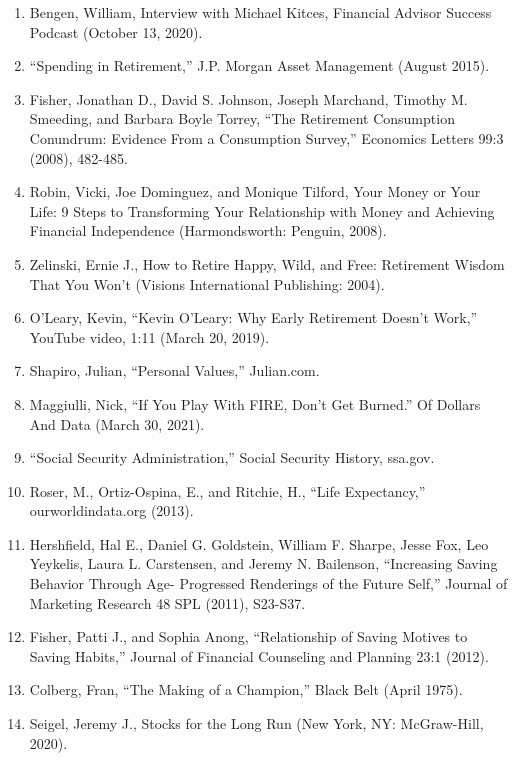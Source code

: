 \begin{enumerate}
\item\hypertarget{endnote:52}{} Bengen, William, Interview with Michael Kitces, Financial Advisor Success Podcast (October 13, 2020).
\item\hypertarget{endnote:53}{} “Spending in Retirement,” J.P. Morgan Asset Management (August 2015).
\item\hypertarget{endnote:54}{} Fisher, Jonathan D., David S. Johnson, Joseph Marchand, Timothy M. Smeeding, and Barbara Boyle Torrey, “The Retirement Consumption Conundrum: Evidence From a Consumption Survey,” Economics Letters 99:3 (2008), 482-485.
\item\hypertarget{endnote:55}{} Robin, Vicki, Joe Dominguez, and Monique Tilford, Your Money or Your Life: 9 Steps to Transforming Your Relationship with Money and Achieving Financial Independence (Harmondsworth: Penguin, 2008).
\item\hypertarget{endnote:56}{} Zelinski, Ernie J., How to Retire Happy, Wild, and Free: Retirement Wisdom That You Won't (Visions International Publishing: 2004).
\item\hypertarget{endnote:57}{} O'Leary, Kevin, “Kevin O'Leary: Why Early Retirement Doesn't Work,” YouTube video, 1:11 (March 20, 2019).
\item\hypertarget{endnote:58}{} Shapiro, Julian, “Personal Values,” Julian.com.
\item\hypertarget{endnote:59}{} Maggiulli, Nick, “If You Play With FIRE, Don't Get Burned.” Of Dollars And Data (March 30, 2021).
\item\hypertarget{endnote:60}{} “Social Security Administration,” Social Security History, ssa.gov.
\item\hypertarget{endnote:61}{} Roser, M., Ortiz-Ospina, E., and Ritchie, H., “Life Expectancy,” ourworldindata.org (2013).
\item\hypertarget{endnote:62}{} Hershfield, Hal E., Daniel G. Goldstein, William F. Sharpe, Jesse Fox, Leo Yeykelis, Laura L. Carstensen, and Jeremy N. Bailenson, “Increasing Saving Behavior Through Age- Progressed Renderings of the Future Self,” Journal of Marketing Research 48 SPL (2011), S23-S37.
\item\hypertarget{endnote:63}{} Fisher, Patti J., and Sophia Anong, “Relationship of Saving Motives to Saving Habits,” Journal of Financial Counseling and Planning 23:1 (2012).
\item\hypertarget{endnote:64}{} Colberg, Fran, “The Making of a Champion,” Black Belt (April 1975).
\item\hypertarget{endnote:65}{} Seigel, Jeremy J., Stocks for the Long Run (New York, NY: McGraw-Hill, 2020).

\end{enumerate}
